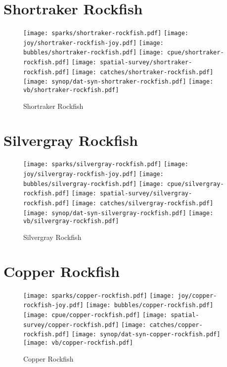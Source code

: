 \section{Shortraker Rockfish}

\begin{figure}[htbp]
\centering
\texttt{[image: sparks/shortraker-rockfish.pdf]}
\texttt{[image: joy/shortraker-rockfish-joy.pdf]}
\texttt{[image: bubbles/shortraker-rockfish.pdf]}
\texttt{[image: cpue/shortraker-rockfish.pdf]}
\texttt{[image: spatial-survey/shortraker-rockfish.pdf]}
\texttt{[image: catches/shortraker-rockfish.pdf]}
\texttt{[image: synop/dat-syn-shortraker-rockfish.pdf]}
\texttt{[image: vb/shortraker-rockfish.pdf]}
\caption{Shortraker Rockfish}
\end{figure}
\clearpage
\section{Silvergray Rockfish}

\begin{figure}[htbp]
\centering
\texttt{[image: sparks/silvergray-rockfish.pdf]}
\texttt{[image: joy/silvergray-rockfish-joy.pdf]}
\texttt{[image: bubbles/silvergray-rockfish.pdf]}
\texttt{[image: cpue/silvergray-rockfish.pdf]}
\texttt{[image: spatial-survey/silvergray-rockfish.pdf]}
\texttt{[image: catches/silvergray-rockfish.pdf]}
\texttt{[image: synop/dat-syn-silvergray-rockfish.pdf]}
\texttt{[image: vb/silvergray-rockfish.pdf]}
\caption{Silvergray Rockfish}
\end{figure}
\clearpage
\section{Copper Rockfish}

\begin{figure}[htbp]
\centering
\texttt{[image: sparks/copper-rockfish.pdf]}
\texttt{[image: joy/copper-rockfish-joy.pdf]}
\texttt{[image: bubbles/copper-rockfish.pdf]}
\texttt{[image: cpue/copper-rockfish.pdf]}
\texttt{[image: spatial-survey/copper-rockfish.pdf]}
\texttt{[image: catches/copper-rockfish.pdf]}
\texttt{[image: synop/dat-syn-copper-rockfish.pdf]}
\texttt{[image: vb/copper-rockfish.pdf]}
\caption{Copper Rockfish}
\end{figure}
\clearpage
